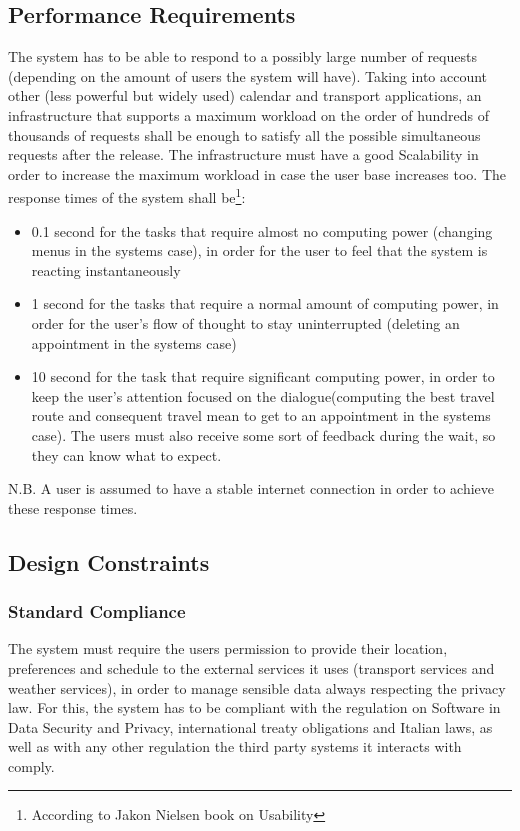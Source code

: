 \documentclass[12pt]{article}
\begin{document}
\subsection{Performance Requirements}
The system has to be able to respond to a possibly large number of requests (depending on the amount of users the system will have). Taking into account other (less powerful but widely used) calendar and transport applications, an infrastructure that supports a maximum workload on the order of hundreds of thousands of requests shall be enough to satisfy all the possible simultaneous requests after the release. The infrastructure must have a good Scalability in order to increase the maximum workload in case the user base increases too. The response times of the system shall be\footnote{According to Jakon Nielsen book on Usability}:
\begin{itemize}
    \item 0.1 second for the tasks that require almost no computing power (changing menus in the systems case), in order for the user to feel that the system is reacting instantaneously
    \item 1 second for the tasks that require a normal amount of computing power, in order for the user's flow of thought to stay uninterrupted (deleting an appointment in the systems case)
    \item 10 second for the task that require significant computing power, in order to keep the user's attention focused on the dialogue(computing the best travel route and consequent travel mean to get to an appointment in the systems case). The users must also receive some sort of feedback during the wait, so they can know what to expect.
\end{itemize}
N.B. A user is assumed to have a stable internet connection in order to achieve these response times.


\subsection{Design Constraints}
\subsubsection{Standard Compliance}
The system must require the users permission to provide their location, preferences and schedule to the external services it uses (transport services and weather services), in order to manage sensible data always respecting the privacy law. For this, the system has to be compliant with the regulation on Software in Data Security and Privacy, international treaty obligations and Italian laws, as well as with any other regulation the third party systems it interacts with comply.
\end{document}
